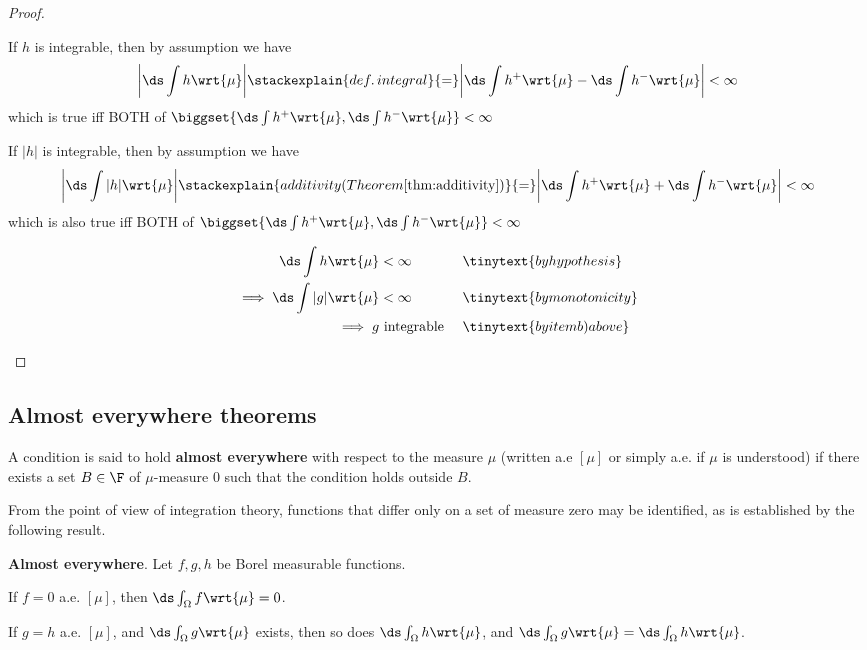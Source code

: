 \documentclass{article} %
\newcommand{\dint}{\ds\int}
\newcommand{\dmu}{\wrt{\mu}}
\begin{document}
\begin{proof}
\begin{alphabate}
\item  If $h$ is integrable, then by assumption we have 
\[ \bigg| \dint h \dmu \bigg| \stackexplain{def. \, integral}{=} \bigg| \dint h^+ \dmu - \dint h^- \dmu \bigg| < \infty \]
which is true iff BOTH of $\biggset{\dint h^+ \dmu , \dint h^- \dmu } < \infty$

If $|h|$ is integrable, then by assumption we have 
\[ \bigg| \dint |h| \dmu \bigg| \stackexplain{additivity  (Theorem \ref{thm:additivity})}{=} \bigg| \dint h^+ \dmu + \dint h^- \dmu \bigg| < \infty \]
which is also true iff BOTH of $\biggset{\dint h^+ \dmu , \dint h^- \dmu } < \infty$
\item 
\begin{align*}
\dint h \dmu &< \infty &&\tinytext{by hypothesis} \\
\implies \dint |g| \dmu &< \infty &&\tinytext{by monotonicity}	\\
\implies g &\text{ integrable } && \tinytext{by item b) above}	
\end{align*}
\end{alphabate}
\end{proof}

\subsection{Almost everywhere theorems}

\begin{definition}
A condition is said to hold \textbf{almost everywhere} with respect to the measure $\mu$ (written a.e $[\mu]$ or simply a.e. if $\mu$ is understood) if there exists a set $B \in \F$ of $\mu$-measure 0 such that the condition holds outside $B$.
\label{def:almost_everywhere}
\end{definition}

From the point of view of integration theory, functions that differ only on a set of measure zero may be identified, as is established by the following result.

\begin{theorem}{\textbf{Almost everywhere}.}
Let $f,g,h$ be Borel measurable functions.
\begin{alphabate}
\item If $f=0$ a.e. $[\mu]$, then $\dint_\Omega f \dmu =0$.
\item If $g=h$ 	a.e. $[\mu]$, and $\dint_\Omega g \dmu$ exists, then so does $\dint_\Omega h \dmu$, and $\dint_\Omega g \dmu  = \dint_\Omega h \dmu$. 
\end{alphabate}
\label{thm:almost_everywhere}
\end{theorem}
\end{document}
